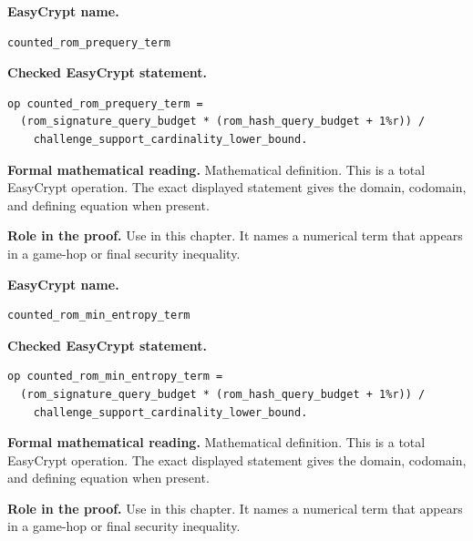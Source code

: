 \begin{formaldefinition}
\noindent\textbf{EasyCrypt name.}
\begin{lstlisting}[language=EasyCrypt,basicstyle=\ttfamily\scriptsize]
counted_rom_prequery_term
\end{lstlisting}
\noindent\textbf{Checked EasyCrypt statement.}
\begin{lstlisting}[language=EasyCrypt,basicstyle=\ttfamily\scriptsize]
op counted_rom_prequery_term =
  (rom_signature_query_budget * (rom_hash_query_budget + 1%r)) /
    challenge_support_cardinality_lower_bound.
\end{lstlisting}
\noindent\textbf{Formal mathematical reading.}
Mathematical definition. This is a total EasyCrypt operation.  The exact displayed statement gives the domain, codomain, and defining equation when present.

\noindent\textbf{Role in the proof.}
Use in this chapter. It names a numerical term that appears in a game-hop or final security inequality.

\end{formaldefinition}

\begin{formaldefinition}
\noindent\textbf{EasyCrypt name.}
\begin{lstlisting}[language=EasyCrypt,basicstyle=\ttfamily\scriptsize]
counted_rom_min_entropy_term
\end{lstlisting}
\noindent\textbf{Checked EasyCrypt statement.}
\begin{lstlisting}[language=EasyCrypt,basicstyle=\ttfamily\scriptsize]
op counted_rom_min_entropy_term =
  (rom_signature_query_budget * (rom_hash_query_budget + 1%r)) /
    challenge_support_cardinality_lower_bound.
\end{lstlisting}
\noindent\textbf{Formal mathematical reading.}
Mathematical definition. This is a total EasyCrypt operation.  The exact displayed statement gives the domain, codomain, and defining equation when present.

\noindent\textbf{Role in the proof.}
Use in this chapter. It names a numerical term that appears in a game-hop or final security inequality.

\end{formaldefinition}

